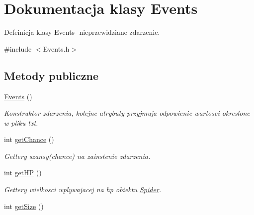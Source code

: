 \hypertarget{class_events}{}\section{Dokumentacja klasy Events}
\label{class_events}


Defeinicja klasy Events-\/ nieprzewidziane zdarzenie.  




{\ttfamily \#include $<$Events.\+h$>$}

\subsection*{Metody publiczne}
\begin{DoxyCompactItemize}
\item 
\hyperlink{class_events_aab651428bab6b09db3564753afb225a6}{Events} ()\hypertarget{class_events_aab651428bab6b09db3564753afb225a6}{}\label{class_events_aab651428bab6b09db3564753afb225a6}

\begin{DoxyCompactList}\small\item\em Konstruktor zdarzenia, kolejne atrybuty przyjmuja odpowienie wartosci okreslone w pliku txt. \end{DoxyCompactList}\item 
int \hyperlink{class_events_a9ff7caa2de24d1778b9f09feda236001}{get\+Chance} ()\hypertarget{class_events_a9ff7caa2de24d1778b9f09feda236001}{}\label{class_events_a9ff7caa2de24d1778b9f09feda236001}

\begin{DoxyCompactList}\small\item\em Gettery szansy(chance) na zainstenie zdarzenia. \end{DoxyCompactList}\item 
int \hyperlink{class_events_ac67e48487a984f409783a499920e4d3f}{get\+HP} ()\hypertarget{class_events_ac67e48487a984f409783a499920e4d3f}{}\label{class_events_ac67e48487a984f409783a499920e4d3f}

\begin{DoxyCompactList}\small\item\em Gettery wielkosci wplywajacej na hp obiektu \hyperlink{class_spider}{Spider}. \end{DoxyCompactList}\item 
int \hyperlink{class_events_ad5bb78b1fe7946627745f5c03b3a48ea}{get\+Size} ()\hypertarget{class_events_ad5bb78b1fe7946627745f5c03b3a48ea}{}\label{class_events_ad5bb78b1fe7946627745f5c03b3a48ea}


\end{DoxyCompactItemize}
